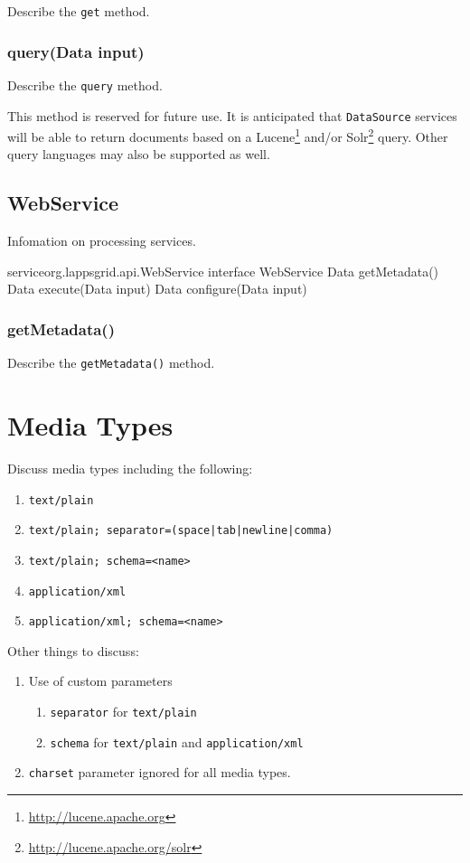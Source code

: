 \documentclass{article}
\newcommand{\source}{\texttt{DataSource}\xspace}
\renewcommand{\tt}[1]{\texttt{#1}}
\newenvironment{enum}{
\begin{enumerate}
  \setlength{\itemsep}{1pt}
  \setlength{\parskip}{0pt}
  \setlength{\parsep}{0pt}
}{\end{enumerate}}
\begin{document}
Describe the \tt{get} method.

\subsubsection{query(Data input)}

Describe the \tt{query} method.

This method is reserved for future use.  It is anticipated that \source services will be able to return documents based on a Lucene\footnote{\url{http://lucene.apache.org}} and/or Solr\footnote{\url{http://lucene.apache.org/solr}} query.  Other query languages may also be supported as well.


\subsection{WebService}\label{sub:WebService}

Infomation on processing services.

\begin{groovy}{service}{org.lappsgrid.api.WebService}
	interface WebService {
		Data getMetadata()
		Data execute(Data input)
		Data configure(Data input)
	}
\end{groovy}

\subsubsection{getMetadata()}

Describe the \tt{getMetadata()} method.


\section{Media Types}\label{sec:media}

Discuss media types including the following:
\begin{enum}
	\item \tt{text/plain}
	\item \tt{text/plain; separator=(space|tab|newline|comma)}
	\item \tt{text/plain; schema=<name>}
	\item \tt{application/xml}
	\item \tt{application/xml; schema=<name>}
\end{enum}

Other things to discuss:
\begin{enum}
	\item Use of custom parameters
	\begin{enum}
		\item \tt{separator} for \tt{text/plain}
		\item \tt{schema} for \tt{text/plain} and \tt{application/xml}
	\end{enum}
	\item \tt{charset} parameter ignored for all media types.
\end{enum}
\end{document}
